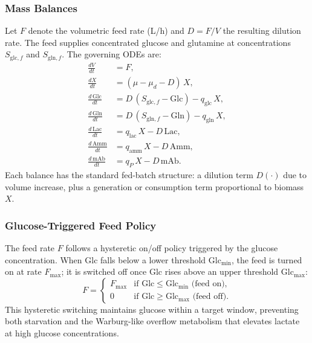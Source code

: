 \subsubsection*{Mass Balances}

Let $F$ denote the volumetric feed rate (L/h) and $D = F/V$ the resulting
dilution rate.  The feed supplies concentrated glucose and glutamine at
concentrations $S_{\text{glc},f}$ and $S_{\text{gln},f}$.  The governing
ODEs are:
\begin{subequations}\label{eq:cho_odes}
\begin{align}
  \frac{dV}{dt}   &= F, \label{eq:cho_V}\\[4pt]
  \frac{dX}{dt}   &= (\mu - \mu_d - D)\,X, \label{eq:cho_X}\\[4pt]
  \frac{d\,\text{Glc}}{dt} &= D\,(S_{\text{glc},f} - \text{Glc})
                              - q_{\text{glc}}\,X, \label{eq:cho_Glc}\\[4pt]
  \frac{d\,\text{Gln}}{dt} &= D\,(S_{\text{gln},f} - \text{Gln})
                              - q_{\text{gln}}\,X, \label{eq:cho_Gln}\\[4pt]
  \frac{d\,\text{Lac}}{dt} &= q_{\text{lac}}\,X - D\,\text{Lac},
                              \label{eq:cho_Lac}\\[4pt]
  \frac{d\,\text{Amm}}{dt} &= q_{\text{amm}}\,X - D\,\text{Amm},
                              \label{eq:cho_Amm}\\[4pt]
  \frac{d\,\text{mAb}}{dt} &= q_P\,X - D\,\text{mAb}. \label{eq:cho_mAb}
\end{align}
\end{subequations}
Each balance has the standard fed-batch structure: a dilution term $D(\cdot)$
due to volume increase, plus a generation or consumption term proportional to
biomass $X$.

\subsubsection*{Glucose-Triggered Feed Policy}

The feed rate $F$ follows a hysteretic on/off policy triggered by the glucose
concentration.  When Glc falls below a lower threshold $\text{Glc}_{\min}$,
the feed is turned on at rate $F_{\max}$; it is switched off once Glc rises
above an upper threshold $\text{Glc}_{\max}$:
\begin{equation}\label{eq:cho_feed}
  F =
  \begin{cases}
    F_{\max} & \text{if Glc} \leq \text{Glc}_{\min} \text{ (feed on)},\\
    0        & \text{if Glc} \geq \text{Glc}_{\max} \text{ (feed off)}.
  \end{cases}
\end{equation}
This hysteretic switching maintains glucose within a target window, preventing
both starvation and the Warburg-like overflow metabolism that elevates lactate
at high glucose concentrations.

